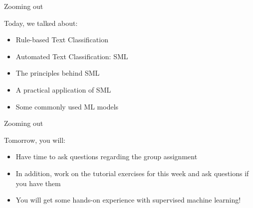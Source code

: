 \documentclass[compress]{beamer}
\begin{document}
\begin{frame}[fragile]{Zooming out} 
	
	\begin{alertblock}{Today, we talked about:}
		\begin{itemize}
			\item Rule-based Text Classification
			\item Automated Text Classification: SML
			\item The principles behind SML
			\item A practical application of SML
			\item Some commonly used ML models
		\end{itemize}
	\end{alertblock}
\end{frame}



\begin{frame}[fragile]{Zooming out} 
	
\begin{alertblock}{Tomorrow, you will:}
	\begin{itemize}
		\item Have time to ask questions regarding the group assignment
		\item In addition, work on the tutorial exercises for this week and ask questions if you have them
		\item You will get some hands-on experience with supervised machine learning!
	\end{itemize}
\end{alertblock}

\end{frame}
\end{document}
